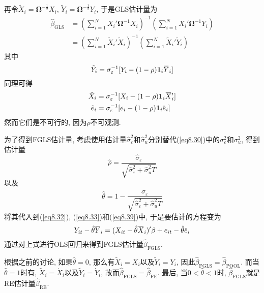 \documentclass[cn, 12pt, math=mtpro2, bibstyle=apa, blue, twocol]{elegantbook}
\newcommand{\hb}{\hat{\beta}}
\newcommand{\BO}{\mathbold{\Omega}}
\newcommand{\overbar}[1]{\mkern 1.5mu\overline{\mkern-1.5mu#1\mkern-1.5mu}\mkern 1.5mu}
\begin{document}
再令$\tilde{X}_i=\BO^{-\frac{1}{2}}X_i$, $\tilde{Y}_i=\BO^{-\frac{1}{2}}Y_i$, 于是GLS估计量为
\begin{align}
\hb_{\text{GLS}}&=\left(\sum_{i=1}^{N}X_i'\BO^{-1}X_i\right)^{-1}\left(\sum_{i=1}^{N}X_i'\BO^{-1}Y_i\right) \nonumber \\
&=\left(\sum_{i=1}^{N}\tilde{X}_i'\tilde{X}_i\right)^{-1}\left(\sum_{i=1}^{N}\tilde{X}_i'\tilde{Y}_i\right) \label{eq8.31}
\end{align}
其中
\begin{equation}\label{eq8.32}
  \tilde{Y}_i=\sigma_\varepsilon^{-1}[Y_i-(1-\rho)\mathbf{1}_i\overbar{Y}_i]
\end{equation}
同理可得
\begin{align}
\tilde{X}_i&=\sigma_\varepsilon^{-1}[X_i-(1-\rho)\mathbf{1}_i\overbar{X}_i'] \label{eq8.33} \\
\tilde{e}_i&=\sigma_\varepsilon^{-1}[e_i-(1-\rho)\mathbf{1}_i\overbar{e}_i] \label{eq8.39}
\end{align}
然而它们是不可行的, 因为$\rho$不可观测.

为了得到FGLS估计量, 考虑使用估计量$\hat{\sigma}_\varepsilon^2$和$\hat{\sigma}_u^2$分别替代(\ref{eq8.30})中的$\sigma_\varepsilon^2$和$\sigma_u^2$, 得到估计量
$$\hat{\rho}=\frac{\hat{\sigma}_\varepsilon}{\sqrt{\hat{\sigma}_\varepsilon^2+\hat{\sigma}_u^2T}}$$
以及
$$\hat{\theta}=1-\frac{\hat{\sigma}_\varepsilon}{\sqrt{\hat{\sigma}_\varepsilon^2+\hat{\sigma}_u^2T}}$$
将其代入到(\ref{eq8.32}), (\ref{eq8.33})和(\ref{eq8.39})中, 于是要估计的方程变为
$$Y_{it}-\hat{\theta}\overbar{Y}_i=(X_{it}-\hat{\theta}\overbar{X}_i)'\beta+e_{it}-\hat{\theta}\overbar{e}_i$$
通过对上式进行OLS回归来得到FGLS估计量$\hb_{\text{FGLS}}$.

根据之前的讨论, 如果$\hat{\theta}=0$, 那么有$\tilde{X}_i=X_i$以及$\tilde{Y}_i=Y_i$, 因此$\hb_{\text{FGLS}}=\hb_{\text{POOL}}$. 而当$\hat{\theta}=1$时有, $\tilde{X}_i=\dot{X}_i$以及$\tilde{Y}_i=\dot{Y}_i$, 故而$\hb_{\text{FGLS}}=\hb_{\text{FE}}$. 最后, 当$0<\hat{\theta}<1$时, $\hb_{\text{FGLS}}$就是RE估计量$\hb_\text{RE}$.
\end{document}

